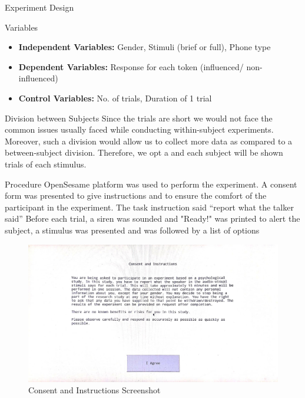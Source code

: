 \documentclass{article}
\begin{document}
\begin{psection}{Experiment Design}
	\begin{psubsection}{Variables}
		\begin{itemize}
			\item \textbf{Independent Variables:} Gender, Stimuli (brief or full), Phone type
			\item \textbf{Dependent Variables:} Response for each token (influenced/ non-influenced)
			\item \textbf{Control Variables:} No. of trials, Duration of 1 trial
		\end{itemize}
	\end{psubsection}
	\begin{psubsection}{Division between Subjects}
		Since the trials are short we would not face the common issues usually faced while conducting within-subject experiments. Moreover, such a division would allow us to collect more data as compared to a between-subject division. Therefore, we opt a  and each subject will be shown trials of each stimulus.
	\end{psubsection}

	\begin{psubsection}{Procedure}
		OpenSesame platform was used to perform the experiment. A consent form was presented to give instructions and to ensure the comfort of the participant in the experiment. The task instruction said ``report what the talker said'' Before each trial, a siren was sounded and "Ready!" was printed to alert the subject, a stimulus was presented and was followed by a list of options

		\begin{figure}[H]
			\centering
			\includegraphics[width=1\textwidth]{includes/consent.jpg}
			\caption{Consent and Instructions Screenshot}
		\end{figure}


\end{psubsection}
\end{psection}
\end{document}
